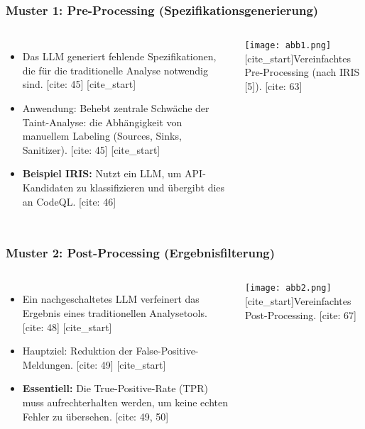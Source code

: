 \documentclass{beamer}
\begin{document}
\begin{frame}
\frametitle{Muster 1: Pre-Processing (Spezifikationsgenerierung)}
\begin{columns}
\begin{itemize}
    [cite_start]\item Das LLM generiert fehlende Spezifikationen, die für die traditionelle Analyse notwendig sind. [cite: 45]
    [cite_start]\item \alert{Anwendung:} Behebt zentrale Schwäche der Taint-Analyse: die Abhängigkeit von manuellem Labeling (Sources, Sinks, Sanitizer). [cite: 45]
    [cite_start]\item \textbf{Beispiel IRIS:} Nutzt ein LLM, um API-Kandidaten zu klassifizieren und übergibt dies an CodeQL. [cite: 46]
\end{itemize}
\texttt{[image: abb1.png]}
[cite_start]\tiny Vereinfachtes Pre-Processing (nach IRIS [5]). [cite: 63]
\end{columns}
\end{frame}

\begin{frame}
\frametitle{Muster 2: Post-Processing (Ergebnisfilterung)}
\begin{columns}
\begin{itemize}
    [cite_start]\item Ein nachgeschaltetes LLM verfeinert das Ergebnis eines traditionellen Analysetools. [cite: 48]
    [cite_start]\item \alert{Hauptziel:} Reduktion der False-Positive-Meldungen. [cite: 49]
    [cite_start]\item \textbf{Essentiell:} Die True-Positive-Rate (TPR) muss aufrechterhalten werden, um keine echten Fehler zu übersehen. [cite: 49, 50]
\end{itemize}
\texttt{[image: abb2.png]}
[cite_start]\tiny Vereinfachtes Post-Processing. [cite: 67]
\end{columns}
\end{frame}
\end{document}
